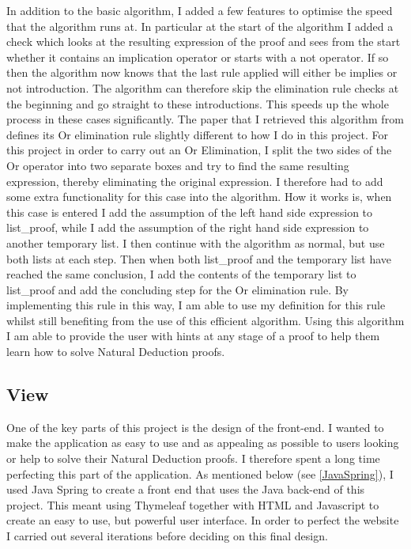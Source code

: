 In addition to the basic algorithm, I added a few features to optimise the speed that the algorithm runs at. In particular at the start of the algorithm I added a check which looks at the resulting expression of the proof and sees from the start whether it contains an implication operator or starts with a not operator. If so then the algorithm now knows that the last rule applied will either be implies or not introduction. The algorithm can therefore skip the elimination rule checks at the beginning and go straight to these introductions. This speeds up the whole process in these cases significantly. The paper that I retrieved this algorithm from defines its Or elimination rule slightly different to how I do in this project. For this project in order to carry out an Or Elimination, I split the two sides of the Or operator into two separate boxes and try to find the same resulting expression, thereby eliminating the original expression. I therefore had to add some extra functionality for this case into the algorithm. How it works is, when this case is entered I add the assumption of the left hand side expression to list\_proof, while I add the assumption of the right hand side expression to another temporary list. I then continue with the algorithm as normal, but use both lists at each step. Then when both list\_proof and the temporary list have reached the same conclusion, I add the contents of the temporary list to list\_proof and add the concluding step for the Or elimination rule. By implementing this rule in this way, I am able to use my definition for this rule whilst still benefiting from the use of this efficient algorithm. Using this algorithm I am able to provide the user with hints at any stage of a proof to help them learn how to solve Natural Deduction proofs.

\subsection{View}

One of the key parts of this project is the design of the front-end. I wanted to make the application as easy to use and as appealing as possible to users looking or help to solve their Natural Deduction proofs. I therefore spent a long time perfecting this part of the application. As mentioned below (see \ref{JavaSpring}), I used Java Spring to create a front end that uses the Java back-end of this project. This meant using Thymeleaf together with HTML and Javascript to create an easy to use, but powerful user interface. In order to perfect the website I carried out several iterations before deciding on this final design.

